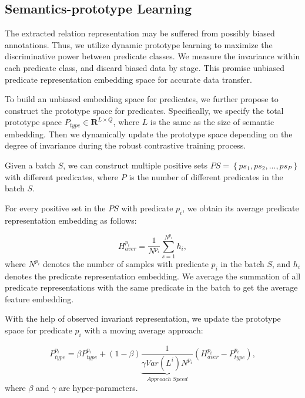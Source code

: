 \documentclass[letterpaper]{article} %
\begin{document}
\subsection{Semantics-prototype Learning}
\label{SPL}
The extracted relation representation may be suffered from possibly biased annotations. Thus, we utilize dynamic prototype learning to maximize the discriminative power between predicate classes. We measure the invariance within each predicate class, and discard biased data by stage. This promise unbiased predicate representation embedding space for accurate data transfer.

 To build an unbiased embedding space for predicates, we further propose to construct the prototype space for predicates. Specifically, we specify the total prototype space $ P_{type} \in \mathbf{R}^{L \times Q} $, where $ L $ is the same as the size of semantic embedding. Then we dynamically update the prototype space depending on the degree of invariance during the robust contrastive training process.

Given a batch $ S $, we can construct multiple positive sets $ PS=\left \{ ps_1,ps_2,...,ps_P \right \}  $ with different predicates, where $ P $ is the number of different predicates in the batch $ S $.

For every positive set in the $ PS $ with predicate $ p_i $, we obtain its average predicate representation embedding as follows:

\begin{equation}
    H_{aver}^{p_i}=\frac{1}{N^{p_i}} {\textstyle \sum_{s=1}^{N^{p_i}}} h_i, 
\end{equation}
where $ N^{p_i} $ denotes the number of samples with predicate $ p_i $ in the batch $ S $, and $ h_i $ denotes the predicate representation embedding. We average the summation of all predicate representations with the same predicate in the batch to get the average feature embedding.

With the help of observed invariant representation, we update the prototype space for predicate $ p_i $ with a moving average approach:


\begin{equation}
    P_{type}^{p_i}=\beta P_{type}^{p_i}+(1-\beta) \underbrace{\frac{1}{ \gamma Var(L^{i})N^{p_i} }}_{Approach\;Speed} (H_{aver}^{p_i}-P_{type}^{p_i}),
\end{equation}
where $ \beta $ and $ \gamma $ are hyper-parameters.
\end{document}
